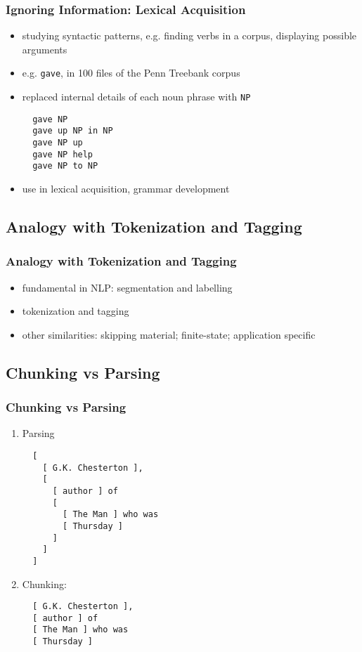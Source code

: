 \documentclass{beamer}             %
\begin{document}
\begin{frame}[fragile]
  \frametitle{Ignoring Information: Lexical Acquisition}

  \begin{itemize}
  \item studying syntactic patterns, e.g. finding verbs in a corpus, displaying possible arguments
  \item e.g. \texttt{gave}, in 100 files of the Penn Treebank corpus
  \item replaced internal details of each noun phrase with \texttt{NP}

\begin{verbatim}
  gave NP
  gave up NP in NP
  gave NP up
  gave NP help
  gave NP to NP
\end{verbatim}
    
  \item use in lexical acquisition, grammar development
  \end{itemize}
\end{frame}

\subsection{Analogy with Tokenization and Tagging}

\begin{frame}[fragile]
  \frametitle{Analogy with Tokenization and Tagging}

  \begin{itemize}
  \item fundamental in NLP: segmentation and labelling
  \item tokenization and tagging \\[2ex]
  \centerline{}
  \item other similarities: skipping material; finite-state; application specific
  \end{itemize}
\end{frame}

\subsection{Chunking vs Parsing}

\begin{frame}[fragile]
  \frametitle{Chunking vs Parsing}
  \scriptsize

  \begin{enumerate}
  \item Parsing
\begin{verbatim}
  [
    [ G.K. Chesterton ],
    [
      [ author ] of
      [
        [ The Man ] who was
        [ Thursday ]
      ]
    ]
  ]
\end{verbatim}

  \item Chunking:
\begin{verbatim}
  [ G.K. Chesterton ],
  [ author ] of
  [ The Man ] who was
  [ Thursday ]
\end{verbatim}
\end{enumerate}
\end{frame}
\end{document}
